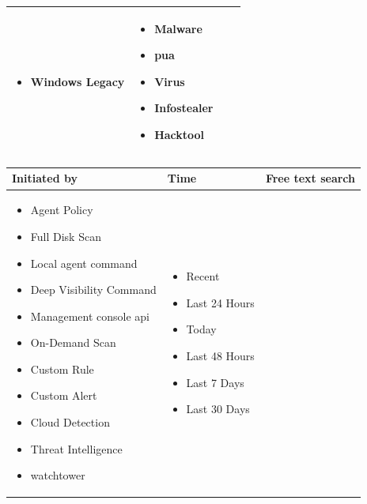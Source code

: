 \begin{longtable}{|p{4cm}|p{4cm}|p{4cm}|p{4cm}|}
\begin{itemize}
            \item Windows Legacy
      \end{itemize}                             &
      \begin{itemize}
            \item Malware
            \item \acrshort{pua}
            \item Virus
            \item Infostealer
            \item Hacktool
      \end{itemize}                                                                                \\
      \hline
\end{longtable}
\begin{longtable}{|p{4cm}|p{4cm}|p{8cm}|}
      \hline
      \rowcolor{blue!20}
      Initiated by                            & Time & Free text search                                                                                                                \\
      \endfirsthead
      \hline
      \begin{itemize}
            \item Agent Policy
            \item Full Disk Scan
            \item Local agent command
            \item Deep Visibility Command
            \item Management console \acrshort{api}
            \item On-Demand Scan
            \item Custom Rule
            \item Custom Alert
            \item Cloud Detection
            \item Threat Intelligence
            \item \gls{watchtower}
      \end{itemize} &
      \begin{itemize}
            \item Recent
            \item Last 24 Hours
            \item Today
            \item Last 48 Hours
            \item Last 7 Days
            \item Last 30 Days

\end{itemize}
\end{longtable}
